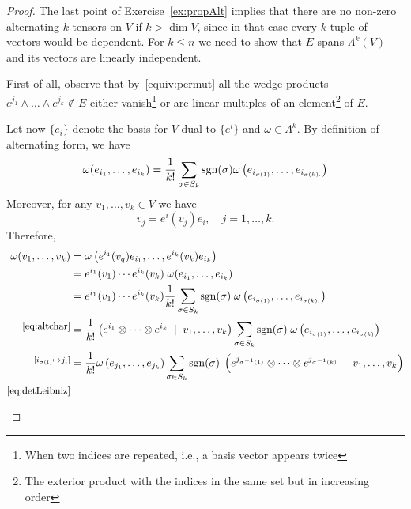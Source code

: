 \begin{proof}
  The last point of Exercise~\ref{ex:propAlt} implies that there are no non-zero alternating $k$-tensors on $V$ if $k >\dim V$, since in that case every $k$-tuple of vectors would be dependent.
  For $k\leq n$ we need to show that $E$ spans $\Lambda^k(V)$ and its vectors are linearly independent.
  
  First of all, observe that by~\eqref{equiv:permut} all the wedge products ${e^{j_1}\wedge\ldots\wedge e^{j_k}\not\in E}$ either vanish\footnote{When two indices are repeated, i.e., a basis vector appears twice} or are linear multiples of an element\footnote{The exterior product with the indices in the same set but in increasing order} of $E$.

  Let now $\{e_i\}$ denote the basis for $V$ dual to $\{e^i\}$ and $\omega\in\Lambda^k$.
  By definition of alternating form, we have
  \begin{equation}\label{eq:altchar}
    \omega(e_{i_1}, \ldots, e_{i_k}) = \frac1{k!} \sum_{\sigma\in S_k}\operatorname{sgn}(\sigma) \omega\left(e_{i_{\sigma(1)}}, \ldots, e_{i_{\sigma(k).}}\right)
  \end{equation}
  Moreover, for any $v_1,\ldots,v_k\in V$ we have
  \begin{equation}
    v_j = e^i(v_j) e_i, \quad j=1,\ldots, k.
  \end{equation}
  Therefore,
  \begin{align}
    \omega(v_1, \ldots, v_k)
    &=\omega\left(e^{i_1}(v_q) e_{i_1}, \ldots, e^{i_k}(v_k) e_{i_k}\right)\\
    &=e^{i_1}(v_1)\cdots e^{i_k}(v_k)\; \omega(e_{i_1}, \ldots, e_{i_k})\\
    &=e^{i_1}(v_1)\cdots e^{i_k}(v_k) \frac1{k!} \sum_{\sigma\in S_k}\sgn(\sigma)\; \omega\left(e_{i_{\sigma(1)}}, \ldots, e_{i_{\sigma(k).}}\right) \\
    \overset{\mbox{\small\eqref{eq:altchar}}}{}
    &= \frac1{k!} \left(e^{i_1}\otimes \cdots \otimes e^{i_k} \;\mid\; v_1, \ldots, v_k\right) \sum_{\sigma\in S_k}\sgn(\sigma)\; \omega\left(e_{i_{\sigma(1)}}, \ldots, e_{i_{\sigma(k)}}\right) \\
    \overset{[i_{\sigma(l)} \mapsto j_l]}{}
    &= \frac1{k!} \omega\left(e_{j_1}, \ldots, e_{j_k}\right) \sum_{\sigma\in S_k} \sgn(\sigma) \;\left(e^{j_{\sigma^{-1}(1)}}\otimes \cdots \otimes e^{j_{\sigma^{-1}(k)}} \;\mid\; v_1, \ldots, v_k\right)\\
    \overset{\mbox{\small\eqref{eq:detLeibniz}}}{}

\end{align}
\end{proof}
